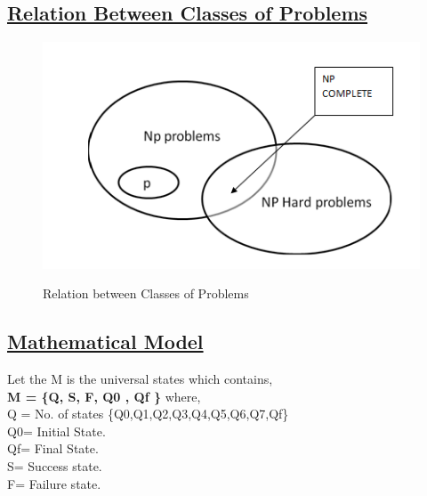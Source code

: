 \subsection*{\underline{Relation Between Classes of Problems}}
 \begin{figure}[H]
    \centering
  \includegraphics[scale=0.9]{np.PNG}\\
 \caption{Relation between Classes of Problems}
  
\end{figure}

\subsection*{\underline{Mathematical Model}}
 Let the M is the universal states which contains, \\
    \textbf{M = \{Q, S, F, Q0 , Qf \}} \newline
    where, \\
    		Q = No. of states \{Q0,Q1,Q2,Q3,Q4,Q5,Q6,Q7,Qf\}\\
    		Q0= Initial State.\\
    		Qf= Final State.\\
    		S= Success state.\\
    		F= Failure state.\\
    		\newline
		
